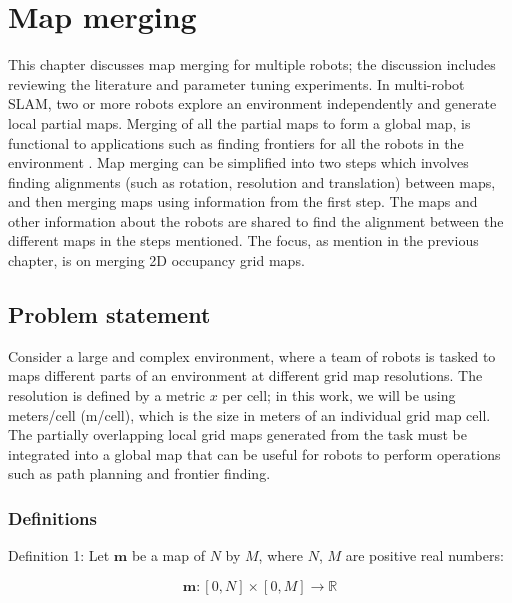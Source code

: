 \chapter{Map merging}
\label{sec:map-merging}
This chapter discusses map merging for multiple robots; the discussion includes reviewing the literature and parameter tuning experiments. In multi-robot SLAM, two or more robots explore an environment independently and generate local partial maps. Merging of all the partial maps to form a global map, is functional to applications such as finding frontiers for all the robots in the environment \cite{Burgard2000}. Map merging can be simplified into two steps which involves finding alignments (such as rotation, resolution and translation) between maps, and then merging maps using information from the first step. The maps and other information about the robots are shared to find the alignment between the different maps in the steps mentioned. The focus, as mention in the previous chapter, is on merging 2D occupancy grid maps.

\section{Problem statement}
Consider a large and complex environment, where a team of robots is tasked to maps different parts of an environment at different grid map resolutions. The resolution is defined by a metric $x$ per cell; in this work, we will be using meters/cell (m/cell), which is the size in meters of an individual grid map cell. The partially overlapping local grid maps generated from the task must be integrated into a global map that can be useful for robots to perform operations such as path planning and frontier finding.

\subsection{Definitions}

Definition 1: Let $\mathbf{m}$ be a map of $N$ by $M$, where $N$, $M$ are positive real numbers:

\begin{equation}
    \mathbf{m}: [0, N] \times [0, M] \rightarrow \mathbb{R}
\end{equation}

